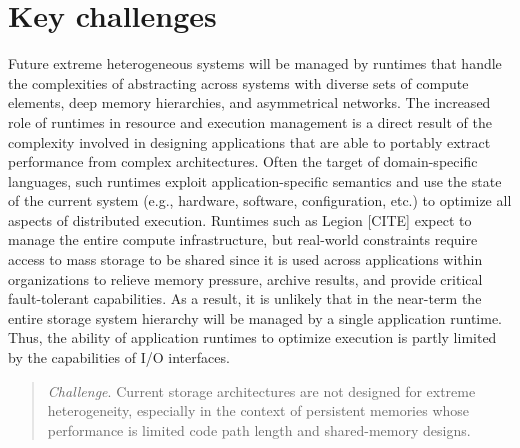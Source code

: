 \documentclass{sig-alternate-05-2015}
\begin{document}

\date{30 July 1999}

\maketitle

\section{Key challenges}

Future extreme heterogeneous systems will be managed by runtimes that handle the
complexities of abstracting across systems with diverse sets of compute
elements, deep memory hierarchies, and asymmetrical networks.  The increased
role of runtimes in resource and execution management is a direct result of the
complexity involved in designing applications that are able to portably extract
performance from complex architectures.  Often the target of domain-specific
languages, such runtimes exploit application-specific semantics and use the
state of the current system (e.g., hardware, software, configuration, etc.) to
optimize all aspects of distributed execution. Runtimes such as Legion [CITE]
expect to manage the entire compute infrastructure, but real-world constraints
require access to mass storage to be shared since it is used across applications
within organizations to relieve memory pressure, archive results, and provide
critical fault-tolerant capabilities. As a result, it is unlikely that in the
near-term the entire storage system hierarchy will be managed by a single
application runtime. Thus, the ability of application runtimes to optimize
execution is partly limited by the capabilities of I/O interfaces.

\begin{quote}
  \emph{Challenge}. Current storage architectures are not designed for extreme
  heterogeneity, especially in the context of persistent memories whose
  performance is limited code path length and shared-memory designs.
\end{quote}
\end{document}
